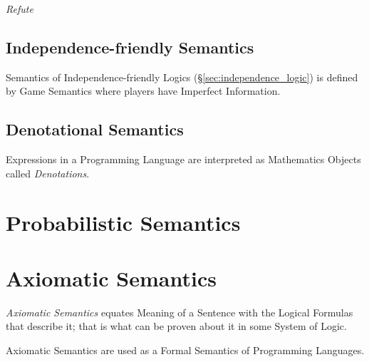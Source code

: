 \emph{Refute}



\subsection{Independence-friendly Semantics}
\label{sec:independence_semantics}

Semantics of Independence-friendly Logics
(\S\ref{sec:independence_logic}) is defined by Game Semantics where
players have Imperfect Information.



\subsection{Denotational Semantics}\label{sec:denotational_semantics}

Expressions in a Programming Language are interpreted as Mathematics
Objects called \emph{Denotations}.



\section{Probabilistic Semantics}\label{sec:probabilistic_semantics}



\section{Axiomatic Semantics}\label{sec:axiomatic_semantics}

\emph{Axiomatic Semantics} equates Meaning of a Sentence with the
Logical Formulas that describe it; that is what can be proven about it
in some System of Logic.

Axiomatic Semantics are used as a Formal Semantics of Programming
Languages.



